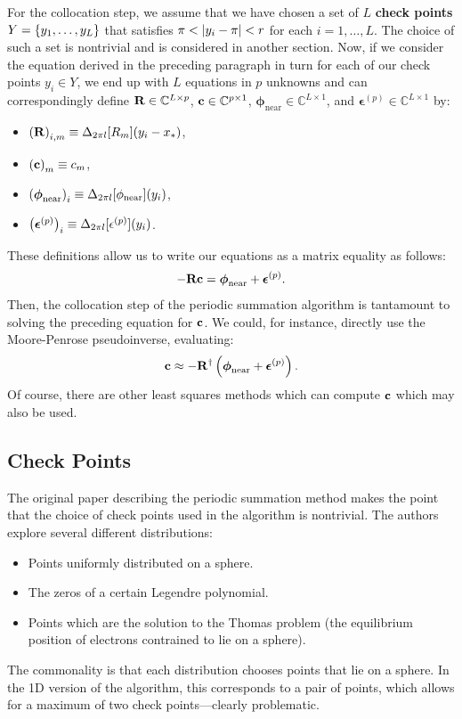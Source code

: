 For the collocation step, we assume that we have chosen a set of $L$
\textbf{check points} $Y = \left\{y_1, \hdots, y_L\right\}$ that satisfies
$\pi < \left|y_i - \pi\right| < r$ for each $i = 1, \hdots, L$.  The choice
of such a set is nontrivial and is considered in another section.
Now, if we consider the equation derived in the preceding paragraph in
turn for each of our check points $y_i \in Y$, we end up with $L$
equations in $p$ unknowns and can correspondingly define
$\bold{R} \in \mathbb{C}^{L \times p}$,
$\bold{c} \in \mathbb{C}^{p \times 1}$,
$\boldsymbol{\phi}_{\operatorname{near}} \in \mathbb{C}^{L \times 1}$,
and $\boldsymbol{\epsilon}^{(p)} \in \mathbb{C}^{L \times 1}$ by:
\begin{itemize}
\item $\left(\bold{R}\right)_{i,m} \equiv \Delta_{2 \pi l}[R_m](y_i - x_*)$,
\item $\left(\bold{c}\right)_m \equiv c_m$,
\item $\left(\boldsymbol{\phi}_{\operatorname{near}}\right)_i \equiv \Delta_{2\pi l}[\phi_{\operatorname{near}}](y_i)$,
\item $\left(\boldsymbol{\epsilon}^{(p)}\right)_i \equiv \Delta_{2\pi l}[\epsilon^{(p)}](y_i)$.
\end{itemize}
These definitions allow us to write our equations as a matrix equality
as follows:
\begin{align*}
  -\bold{R} \bold{c} = \boldsymbol{\phi}_{\operatorname{near}} + \boldsymbol{\epsilon}^{(p)}.
\end{align*}
Then, the collocation step of the periodic summation algorithm is
tantamount to solving the preceding equation for $\bold{c}$.
We could, for instance, directly use the Moore-Penrose pseudoinverse,
evaluating:
\begin{align*}
  \bold{c} \approx -\bold{R}^\dagger \left(\boldsymbol{\phi}_{\operatorname{near}} + \boldsymbol{\epsilon}^{(p)}\right).
\end{align*}
Of course, there are other least squares methods which can compute
$\bold{c}$ which may also be used.

\subsection*{Check Points}

The original paper describing the periodic summation method makes the
point that the choice of check points used in the algorithm is
nontrivial. The authors explore several different distributions:
\begin{itemize}
\item Points uniformly distributed on a sphere.
\item The zeros of a certain Legendre polynomial.
\item Points which are the solution to the Thomas problem (the
  equilibrium position of electrons contrained to lie on a sphere).
\end{itemize}
The commonality is that each distribution chooses points that lie on a
sphere. In the 1D version of the algorithm, this corresponds to a pair
of points, which allows for a maximum of two check points\----clearly
problematic.

